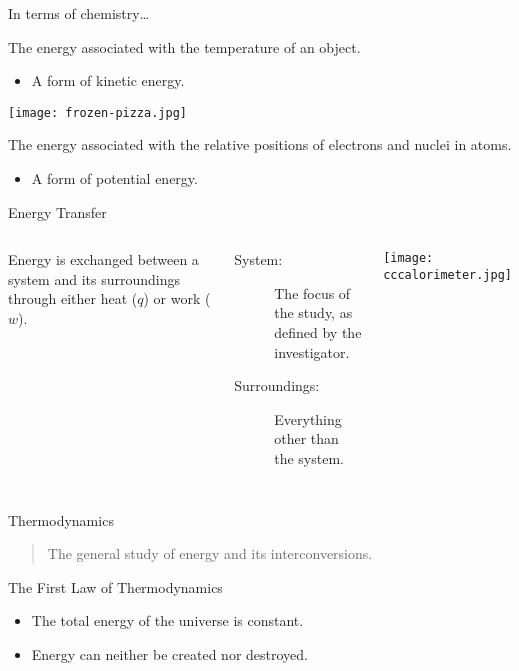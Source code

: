 \documentclass[11pt,letterpaper]{article}
\begin{document}
\begin{frame}{In terms of chemistry\ldots}
	\begin{description}[<+->]
		\item[Thermal Energy:] The energy associated with the
			\alert{temperature} of an object.
			\begin{itemize}[<1->]
				\item A form of \alert{kinetic energy}. 
			\end{itemize}
			\begin{center}
				\texttt{[image: frozen-pizza.jpg]}
			\end{center}

		\item[Chemical Energy:] The energy associated with the
			relative positions of electrons and nuclei in atoms.
			\begin{itemize}[<1->]
				\item A form of \alert{potential energy}.
			\end{itemize}
	\end{description}
\end{frame}

\begin{frame}{Energy Transfer}
	\begin{columns}
		Energy is \alert{exchanged} between a system and its surroundings through
		either \alert{heat} ($q$) or \alert{work} ($w$).

		\begin{description}
			\item[System:] The focus of the study, as defined by the
				investigator.
			\item[Surroundings:] Everything other than the system.
		\end{description}
	
		\begin{center}
			\texttt{[image: cccalorimeter.jpg]}
		\end{center}
	\end{columns}
\end{frame}

\begin{frame}{Thermodynamics}
	\begin{quote}
		The general study of energy and its interconversions.
	\end{quote}

	\bigskip

	\begin{block}{The First Law of Thermodynamics}
		\begin{itemize}
			\item The total energy of the universe is constant.
			\item Energy can neither be created nor destroyed.
		\end{itemize}
	\end{block}
\end{frame}
\end{document}

